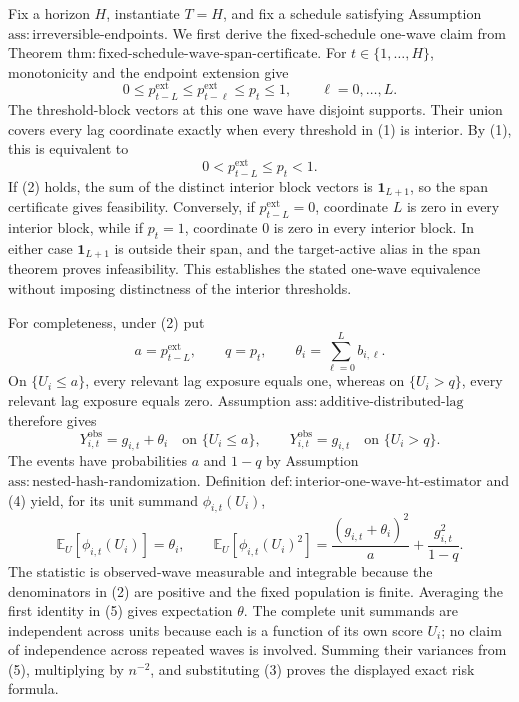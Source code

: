 Fix a horizon \(H\), instantiate \(T=H\), and fix a schedule satisfying Assumption \(\mathrm{ass:irreversible\text{-}endpoints}\).  We first derive the fixed-schedule one-wave claim from Theorem \(\mathrm{thm:fixed\text{-}schedule\text{-}wave\text{-}span\text{-}certificate}\).  For \(t\in\{1,\ldots,H\}\), monotonicity and the endpoint extension give
\[
 0\le p^{\mathrm{ext}}_{t-L}
 \le p^{\mathrm{ext}}_{t-\ell}
 \le p_t\le1,
 \qquad \ell=0,\ldots,L.
\tag{1}
\]
The threshold-block vectors at this one wave have disjoint supports.  Their union covers every lag coordinate exactly when every threshold in (1) is interior.  By (1), this is equivalent to
\[
 0<p^{\mathrm{ext}}_{t-L}\le p_t<1.
\tag{2}
\]
If (2) holds, the sum of the distinct interior block vectors is \(\mathbf 1_{L+1}\), so the span certificate gives feasibility.  Conversely, if \(p^{\mathrm{ext}}_{t-L}=0\), coordinate \(L\) is zero in every interior block, while if \(p_t=1\), coordinate \(0\) is zero in every interior block.  In either case \(\mathbf 1_{L+1}\) is outside their span, and the target-active alias in the span theorem proves infeasibility.  This establishes the stated one-wave equivalence without imposing distinctness of the interior thresholds.

For completeness, under (2) put
\[
 a=p^{\mathrm{ext}}_{t-L},\qquad q=p_t,
 \qquad \theta_i=\sum_{\ell=0}^{L}b_{i,\ell}.
\tag{3}
\]
On \(\{U_i\le a\}\), every relevant lag exposure equals one, whereas on \(\{U_i>q\}\), every relevant lag exposure equals zero.  Assumption \(\mathrm{ass:additive\text{-}distributed\text{-}lag}\) therefore gives
\[
 Y^{\mathrm{obs}}_{i,t}=g_{i,t}+\theta_i
 \quad\text{on }\{U_i\le a\},
 \qquad
 Y^{\mathrm{obs}}_{i,t}=g_{i,t}
 \quad\text{on }\{U_i>q\}.
\tag{4}
\]
The events have probabilities \(a\) and \(1-q\) by Assumption \(\mathrm{ass:nested\text{-}hash\text{-}randomization}\).  Definition \(\mathrm{def:interior\text{-}one\text{-}wave\text{-}ht\text{-}estimator}\) and (4) yield, for its unit summand \(\phi_{i,t}(U_i)\),
\[
 \mathbb E_U[\phi_{i,t}(U_i)]=\theta_i,
 \qquad
 \mathbb E_U[\phi_{i,t}(U_i)^2]
 =\frac{(g_{i,t}+\theta_i)^2}{a}
  +\frac{g_{i,t}^2}{1-q}.
\tag{5}
\]
The statistic is observed-wave measurable and integrable because the denominators in (2) are positive and the fixed population is finite.  Averaging the first identity in (5) gives expectation \(\theta\).  The complete unit summands are independent across units because each is a function of its own score \(U_i\); no claim of independence across repeated waves is involved.  Summing their variances from (5), multiplying by \(n^{-2}\), and substituting (3) proves the displayed exact risk formula.

